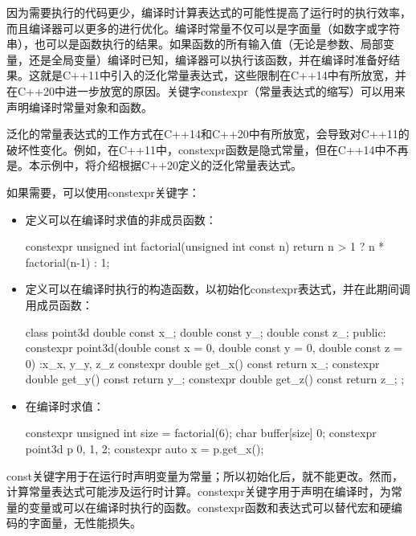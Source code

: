 因为需要执行的代码更少，编译时计算表达式的可能性提高了运行时的执行效率，而且编译器可以更多的进行优化。编译时常量不仅可以是字面量（如数字或字符串），也可以是函数执行的结果。如果函数的所有输入值（无论是参数、局部变量，还是全局变量）编译时已知，编译器可以执行该函数，并在编译时准备好结果。这就是C++11中引入的泛化常量表达式，这些限制在C++14中有所放宽，并在C++20中进一步放宽的原因。关键字constexpr（常量表达式的缩写）可以用来声明编译时常量对象和函数。

泛化的常量表达式的工作方式在C++14和C++20中有所放宽，会导致对C++11的破坏性变化。例如，在C++11中，constexpr函数是隐式常量，但在C++14中不再是。本示例中，将介绍根据C++20定义的泛化常量表达式。


如果需要，可以使用constexpr关键字：

\begin{itemize}
\item
定义可以在编译时求值的非成员函数：

\begin{cpp}
constexpr unsigned int factorial(unsigned int const n)
{
    return n > 1 ? n * factorial(n-1) : 1;
}
\end{cpp}

\item
定义可以在编译时执行的构造函数，以初始化constexpr表达式，并在此期间调用成员函数：

\begin{cpp}
class point3d
{
    double const x_;
    double const y_;
    double const z_;
public:
    constexpr point3d(double const x = 0,
    double const y = 0,
    double const z = 0)
    :x_{x}, y_{y}, z_{z}
    {}
    constexpr double get_x() const {return x_;}
    constexpr double get_y() const {return y_;}
    constexpr double get_z() const {return z_;}
};
\end{cpp}

\item
在编译时求值：

\begin{cpp}
constexpr unsigned int size = factorial(6);
char buffer[size] {0};
constexpr point3d p {0, 1, 2};
constexpr auto x = p.get_x();
\end{cpp}
\end{itemize}


const关键字用于在运行时声明变量为常量；所以初始化后，就不能更改。然而，计算常量表达式可能涉及运行时计算。constexpr关键字用于声明在编译时，为常量的变量或可以在编译时执行的函数。constexpr函数和表达式可以替代宏和硬编码的字面量，无性能损失。

